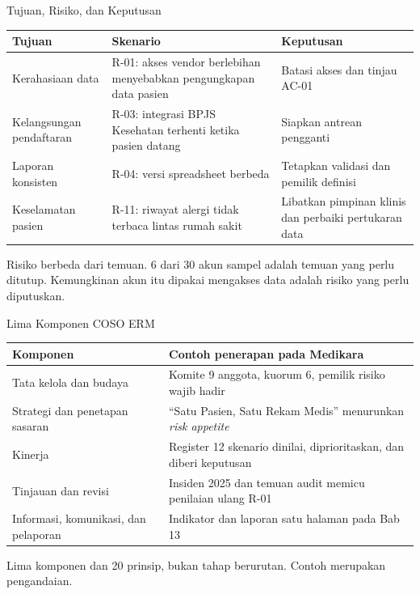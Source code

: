 \documentclass[aspectratio=169, table, 12pt]{beamer}
\begin{document}
\begin{frame}{{\Large Tujuan, Risiko, dan Keputusan}}
  \vspace{4pt}
  \footnotesize
  \begin{tabularx}{\textwidth}{|>{\raggedright\arraybackslash}p{}|>{\raggedright\arraybackslash}X|>{\raggedright\arraybackslash}X|}
    \hline
    \textbf{Tujuan} & \textbf{Skenario} & \textbf{Keputusan} \\ \hline
    Kerahasiaan data & R-01: akses vendor berlebihan menyebabkan pengungkapan data pasien & Batasi
    akses dan tinjau AC-01 \\ \hline
    Kelangsungan pendaftaran & R-03: integrasi BPJS Kesehatan terhenti ketika pasien datang &
    Siapkan antrean pengganti \\ \hline
    Laporan konsisten & R-04: versi spreadsheet berbeda & Tetapkan validasi dan pemilik definisi \\
    \hline
    Keselamatan pasien & R-11: riwayat alergi tidak terbaca lintas rumah sakit & Libatkan pimpinan
    klinis dan perbaiki pertukaran data \\ \hline
  \end{tabularx}

  \vspace{6pt}
  \small Risiko berbeda dari temuan. 6 dari 30 akun sampel adalah temuan yang perlu ditutup.
  Kemungkinan akun itu dipakai mengakses data adalah risiko yang perlu diputuskan.
\end{frame}

\begin{frame}{{\Large Lima Komponen COSO ERM}}
  \vspace{4pt}
  \footnotesize
  \begin{tabularx}{\textwidth}{|>{\raggedright\arraybackslash}p{}|>{\raggedright\arraybackslash}X|}
    \hline
    \textbf{Komponen} & \textbf{Contoh penerapan pada Medikara} \\ \hline
    Tata kelola dan budaya & Komite 9 anggota, kuorum 6, pemilik risiko wajib hadir \\ \hline
    Strategi dan penetapan sasaran & ``Satu Pasien, Satu Rekam Medis'' menurunkan \textit{risk
    appetite} \\ \hline
    Kinerja & Register 12 skenario dinilai, diprioritaskan, dan diberi keputusan \\ \hline
    Tinjauan dan revisi & Insiden 2025 dan temuan audit memicu penilaian ulang R-01 \\ \hline
    Informasi, komunikasi, dan pelaporan & Indikator dan laporan satu halaman pada Bab 13 \\ \hline
  \end{tabularx}

  \vspace{6pt}
  \small Lima komponen dan 20 prinsip, bukan tahap berurutan. Contoh merupakan pengandaian.
\end{frame}
\end{document}
